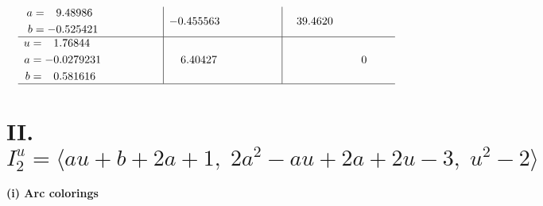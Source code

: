 \documentclass[1p]{elsarticle_modified}
\theoremstyle{definition}
\begin{document}
$$\begin{array}{c|c|c}
\begin{aligned}
a &= \phantom{-}9.48986\phantom{ +0.000000I} \\
b &= -0.525421\phantom{ +0.000000I}\end{aligned}
 & -0.455563\phantom{ +0.000000I} & \phantom{-}39.4620\phantom{ +0.000000I} \\ \hline\begin{aligned}
u &= \phantom{-}1.76844\phantom{ +0.000000I} \\
a &= -0.0279231\phantom{ +0.000000I} \\
b &= \phantom{-}0.581616\phantom{ +0.000000I}\end{aligned}
 & \phantom{-}6.40427\phantom{ +0.000000I} & \phantom{-0.000000 } 0\\
 \hline 
 \end{array}$$\newpage\newpage\renewcommand{\arraystretch}{1}
\centering \section*{II. $I^u_{2}= \langle a u+b+2 a+1,\;2 a^2- a u+2 a+2 u-3,\;u^2-2 \rangle$}
\flushleft \textbf{(i) Arc colorings}\\
\end{document}
